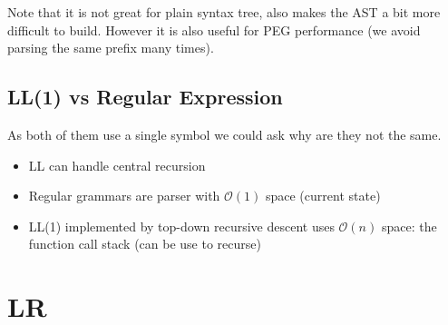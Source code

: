                 Note that it is not great for plain syntax tree, also makes the
                AST a bit more difficult to build. However it is also useful for
                PEG performance (we avoid parsing the same prefix many times).
    \subsection{LL(1) vs Regular Expression}
        As both of them use a single symbol we could ask why are they not the same.
        \begin{itemize}
            \item LL can handle central recursion
            \item Regular grammars are parser with $\mathcal{O}(1)$ space (current state)
            \item LL(1) implemented by top-down recursive descent uses
            $\mathcal{O}(n)$ space: the function call stack (can be use to
            recurse) 
        \end{itemize}
\section{LR}